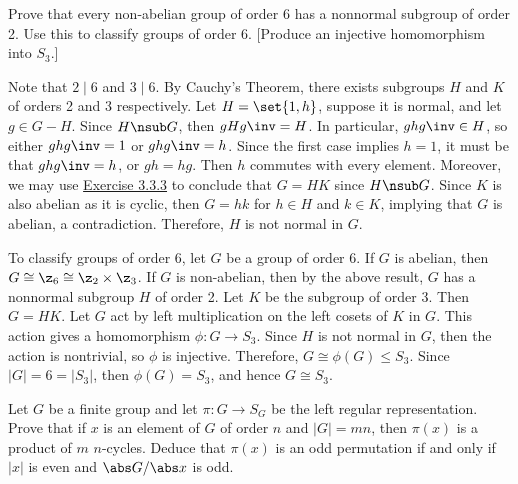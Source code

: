 \begin{exercise} \label{ex4.2.10}
	Prove that every non-abelian group of order 6 has a nonnormal subgroup of order 2. Use this to classify groups of order 6. [Produce an injective homomorphism into $S_3$.]
\end{exercise}

\begin{sol}
	Note that $2 \mid 6$ and $3 \mid 6$. By Cauchy's Theorem, there exists subgroups $H$ and $K$ of orders 2 and 3 respectively. Let $H = \set{1, h}$, suppose it is normal, and let $g \in G - H$. Since $H \nsub G$, then $gHg\inv = H$. In particular, $ghg\inv \in H$, so either $ghg\inv = 1$ or $ghg\inv = h$. Since the first case implies $h = 1$, it must be that $ghg\inv = h$, or $gh = hg$. Then $h$ commutes with every element. Moreover, we may use \hyperref[ex3.3.3]{Exercise 3.3.3} to conclude that $G = HK$ since $H \nsub G$. Since $K$ is also abelian as it is cyclic, then $G = hk$ for $h \in H$ and $k \in K$, implying that $G$ is abelian, a contradiction. Therefore, $H$ is not normal in $G$.

	To classify groups of order 6, let $G$ be a group of order 6. If $G$ is abelian, then $G \cong \z_6 \cong \z_2 \times \z_3$. If $G$ is non-abelian, then by the above result, $G$ has a nonnormal subgroup $H$ of order 2. Let $K$ be the subgroup of order 3. Then $G = HK$. Let $G$ act by left multiplication on the left cosets of $K$ in $G$. This action gives a homomorphism $\phi : G \to S_3$. Since $H$ is not normal in $G$, then the action is nontrivial, so $\phi$ is injective. Therefore, $G \cong \phi(G) \leq S_3$. Since $|G| = 6 = |S_3|$, then $\phi(G) = S_3$, and hence $G \cong S_3$.
\end{sol}

\begin{exercise}
	\label{ex4.2.11} Let $G$ be a finite group and let $\pi : G \to S_G$ be the left regular representation. Prove that if $x$ is an element of $G$ of order $n$ and $|G| = mn$, then $\pi(x)$ is a product of $m$ $n$-cycles. Deduce that $\pi(x)$ is an odd permutation if and only if $|x|$ is even and $\abs G/\abs x$ is odd.
\end{exercise}

